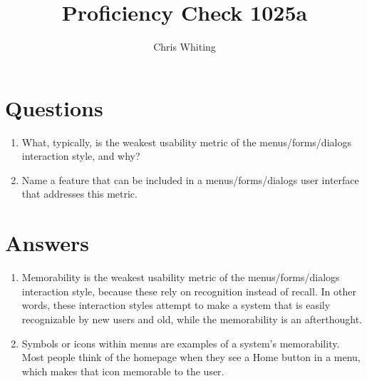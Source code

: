\documentclass[11pt]{article}
\title{ Proficiency Check 1025a}
\author{Chris Whiting}
\begin{document}
\maketitle

 
\section*{Questions}

\begin{enumerate}
\item What, typically, is the weakest usability metric of the menus/forms/dialogs interaction style, and why?

\item Name a feature that can be included in a menus/forms/dialogs user interface that addresses this metric.
\end{enumerate}

\section*{Answers}

\begin{enumerate}
\item 
Memorability is the weakest usability metric of the menus/forms/dialogs interaction style, because these rely on recognition instead of recall. In other words, these interaction styles attempt to make a system that is easily recognizable by new users and old, while the memorability is an afterthought.

\item 
Symbols or icons within menus are examples of a system's memorability. Most people think of the homepage when they see a Home button in a menu, which makes that icon memorable to the user. 
\end{enumerate}
\end{document}
